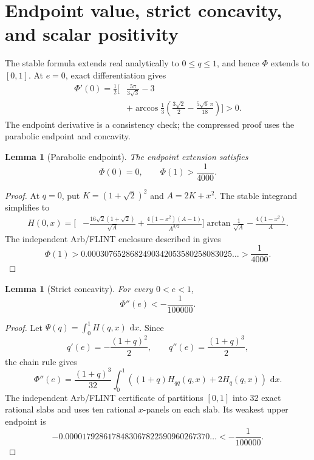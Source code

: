 \documentclass[11pt]{article}
\numberwithin{equation}{section}
\newtheorem{lemma}[theorem]{Lemma}
\theoremstyle{remark}
\newcommand{\dd}{\,\mathrm d}
\begin{document}
\section{Endpoint value, strict concavity, and scalar positivity}
\label{sec:certificate}

The stable formula extends real analytically to \(0\le q\le1\), and hence \(\Phi\) extends to \([0,1]\).  At \(e=0\), exact differentiation gives
\begin{equation}
\begin{aligned}
  \Phi'(0)=\frac12\bigg[&\frac{5\pi}{3\sqrt3}-3\\
  &+\arccos\frac13
  \left(\frac{3\sqrt2}{2}-\frac{5\sqrt6\,\pi}{18}\right)
  \bigg]>0.
\end{aligned}
\label{eq:phi-prime-zero}
\end{equation}
The endpoint derivative is a consistency check; the compressed proof uses the parabolic endpoint and concavity.

\begin{lemma}[Parabolic endpoint]
\label{lem:parabolic-endpoint}
The endpoint extension satisfies
\begin{equation}
  \Phi(0)=0,
  \qquad
  \Phi(1)>\frac1{4000}.
  \label{eq:endpoint-bound}
\end{equation}
\end{lemma}

\begin{proof}
At \(q=0\), put \(K=(1+\sqrt2)^2\) and \(A=2K+x^2\).  The stable integrand simplifies to
\begin{equation}
\begin{aligned}
H(0,x)=\bigg[&-\frac{16\sqrt2(1+\sqrt2)}{\sqrt A}
 +\frac{4(1-x^2)(A-1)}{A^{3/2}}\bigg]
 \arctan\frac1{\sqrt A}
 -\frac{4(1-x^2)}A.
\end{aligned}
\label{eq:endpoint-integrand}
\end{equation}
The independent Arb/FLINT enclosure described in  gives
\[
  \Phi(1)>
  0.0003076528682490342053580258083025\ldots
  >\frac1{4000}.
\]
\end{proof}

\begin{lemma}[Strict concavity]
\label{lem:concavity}
For every \(0<e<1\),
\begin{equation}
  \Phi''(e)<-\frac1{100000}.
  \label{eq:concavity-bound}
\end{equation}
\end{lemma}

\begin{proof}
Let \(\Psi(q)=\int_0^1H(q,x)\,\dd x\).  Since
\[
  q'(e)=-\frac{(1+q)^2}{2},
  \qquad
  q''(e)=\frac{(1+q)^3}{2},
\]
the chain rule gives
\begin{equation}
  \Phi''(e)=\frac{(1+q)^3}{32}
  \int_0^1\left((1+q)H_{qq}(q,x)+2H_q(q,x)\right)\,\dd x.
  \label{eq:concavity-identity}
\end{equation}
The independent Arb/FLINT certificate of  partitions \([0,1]\) into 32 exact rational slabs and uses ten rational \(x\)-panels on each slab.  Its weakest upper endpoint is
\[
  -0.0000179286178483067822590960267370\ldots
  <-\frac1{100000}.
\]
\end{proof}
\end{document}
